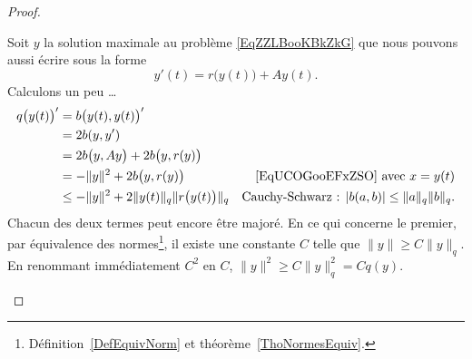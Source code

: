 \begin{proof}
\begin{subproof}
    Soit \( y\) la solution maximale au problème \eqref{EqZZLBooKBkZkG} que nous pouvons aussi écrire sous la forme
    \begin{equation}
        y'(t)=r\big( y(t) \big)+Ay(t).
    \end{equation}
    Calculons un peu \ldots
    \begin{subequations}    \label{subeqsZCOLooOzTBLr}
        \begin{align}
            q\big( y(t) \big)'&=b\big( y(t),y(t) \big)'\\
            &=2b(y,y')\\
            &=2b\big( y,Ay \big)+2b\big( y,r(y) \big)\\
            &=-\| y \|^2+2b\big( y,r(y) \big)       &\text{\eqref{EqUCOGooEFxZSO} avec } x=y(t)\\
            &\leq -\| y \|^2+2\| y(t) \|_q\| r\big( y(t) \big) \|_q &\text{Cauchy-Schwarz : } | b(a,b) |\leq \| a \|_q\| b \|_q\text{.}
        \end{align}
    \end{subequations}
    Chacun des deux termes peut encore être majoré. En ce qui concerne le premier, par équivalence des normes\footnote{Définition~\ref{DefEquivNorm} et théorème~\ref{ThoNormesEquiv}.}, il existe une constante \( C\) telle que \( \| y \|\geq C \| y \|_q\). En renommant immédiatement $C^2$ en \( C\), \( \| y \|^2\geq C\| y \|_q^2=Cq(y)\).


\end{subproof}
\end{proof}
